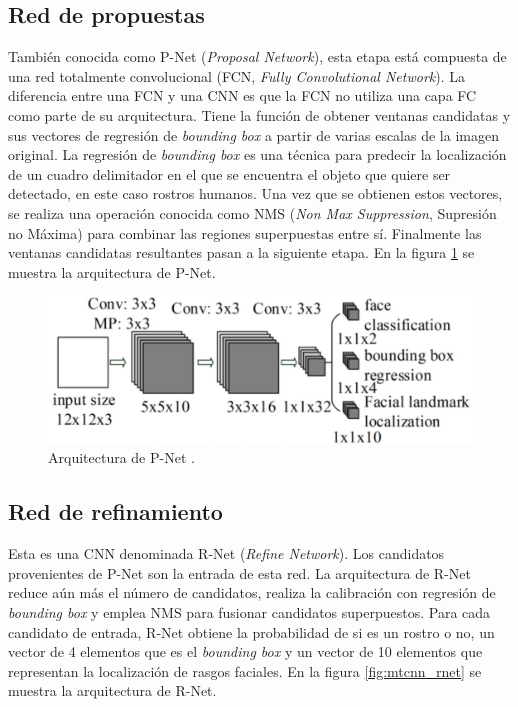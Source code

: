 \subsection{Red de propuestas}
También conocida como P-Net (\textit{Proposal Network}), esta etapa está compuesta de una red totalmente convolucional (FCN, \textit{Fully Convolutional Network}). La diferencia entre una FCN y una CNN es que la FCN no utiliza una capa FC como parte de su arquitectura. Tiene la función de obtener ventanas candidatas y sus vectores de regresión de \textit{bounding box} a partir de varias escalas de la imagen original. La regresión de \textit{bounding box} es una técnica para predecir la localización de un cuadro delimitador en el que se encuentra el objeto que quiere ser detectado, en este caso rostros humanos. Una vez que se obtienen estos vectores, se realiza una operación conocida como NMS (\textit{Non Max Suppression}, Supresión no Máxima) para combinar las regiones superpuestas entre sí. Finalmente las ventanas candidatas resultantes pasan a la siguiente etapa. En la figura \ref{fig:mtcnn_pnet} se muestra la arquitectura de P-Net.

\begin{figure}[h]
	\centering
	\includegraphics[scale=0.25]{./Figures/mtcnn_pnet.png}
	\caption{Arquitectura de P-Net \cite{mtcnn_info}.}
	\label{fig:mtcnn_pnet}
\end{figure}
	
\subsection{Red de refinamiento}
Esta es una CNN denominada R-Net (\textit{Refine Network}). Los candidatos provenientes de P-Net son la entrada de esta red. La arquitectura de R-Net reduce aún más el número de candidatos, realiza la calibración con regresión de \textit{bounding box} y emplea NMS para fusionar candidatos superpuestos. Para cada candidato de entrada, R-Net obtiene la probabilidad de si es un rostro o no, un vector de 4 elementos que es el \textit{bounding box} y un vector de 10 elementos que representan la localización de rasgos faciales. En la figura \ref{fig:mtcnn_rnet} se muestra la arquitectura de R-Net.

